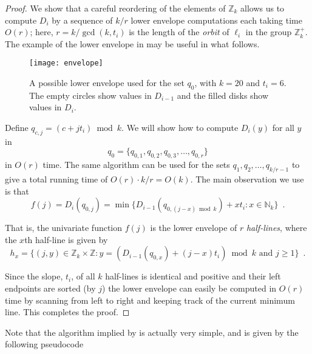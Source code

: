\documentclass{elsart}
\newcommand{\Z}{\mathbb{Z}}
\newcommand{\N}{\mathbb{N}}
\newcommand{\defeq}{=}
\begin{document}
\begin{proof}
We show that a careful reordering of the elements of $\Z_k$ allows us
to compute $D_i$ by a sequence of $k/r$ lower envelope computations
each taking time $O(r)$; here, $r=k/\gcd(k,t_i)$ is the length of
the \emph{orbit} of $\ell_i$ in the group $\mathbb{Z}_k^+$.  The
example of 
the lower envelope in
 may be useful in what follows.

\begin{figure}
\begin{center}
\texttt{[image: envelope]}
\end{center}
\caption{A possible lower envelope used for the set $q_{0}$, with $k=20$
and $t_i=6$.   The empty circles show values in $D_{i-1}$ and
the filled disks show values in $D_i$.}
\end{figure}

Define $q_{c,j} = (c + jt_i)\bmod k$.  We will show how to compute
$D_{i}(y)$ for all $y$ in 
\[ 
    q_{0}=\{q_{0,1}, q_{0,2},q_{0,3},\ldots,q_{0,r}\}
\]
in $O(r)$ time.  The same algorithm can be used for the sets $q_{1},
q_{2}, \ldots, q_{k/r-1}$ to give a total running time of
$O(r)\cdot k/r= O(k)$.
The main observation we use is that
\begin{equation}
    f(j) \defeq D_{i}(q_{0,j}) = \min\{D_{i-1}(q_{0,(j-x)\bmod k})+xt_i :
x\in \N_k\} \enspace .
\end{equation}

That is, the univariate function $f(j)$ is the lower envelope of $r$
\emph{half-lines}, where the $x$th half-line is given by
\[
   h_x = \{(j,y)\in \Z_k\times \Z :
          \mbox{$y=(D_{i-1}(q_{0,x}) + (j-x)t_i)\bmod k$ 
               and $j\ge 1$}\} \enspace . 
\]

Since the slope, $t_i$, of all $k$ half-lines is identical and
positive and their left endpoints are sorted (by $j$) the lower
envelope can easily be computed in $O(r)$ time by scanning from left
to right and keeping track of the current minimum line.  This
completes the proof.  
\end{proof}

Note that the algorithm implied by  is actually very
simple, and is given by the following pseudocode

\noindent\begin{minipage}{\textwidth}
\begin{algorithmic}[1]
  \STATE{$\mu \gets \infty$}
  \ENDFOR
  \ENDFOR
\ENDFOR
\end{algorithmic}
\end{minipage}
\end{document}

